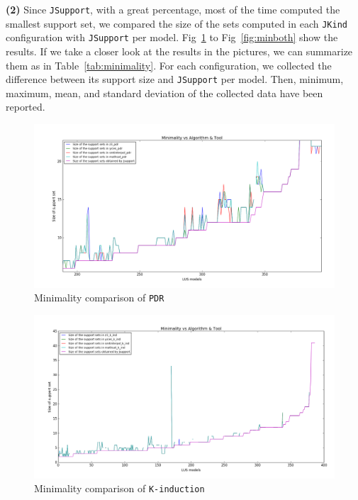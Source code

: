 \noindent{}
 \vspace{9pt}

\textbf{(2)} Since \texttt{JSupport}, with a great percentage, most of the time computed the smallest support set, we compared the size of the sets computed in each \texttt{JKind} configuration with \texttt{JSupport} per model. Fig~\ref{fig:minpdr} to Fig~\ref{fig:minboth} show the results. If we take a closer look at the results in the pictures, we can summarize them as in Table~\ref{tab:minimality}. For each configuration, we collected the difference between its support size and \texttt{JSupport} per model. Then, minimum, maximum, mean, and standard deviation of the collected data have been reported.

\begin{figure}
  \centering
  \includegraphics[width=\textwidth]{figs/minimality_pdr.png}
  \caption{Minimality comparison of \texttt{PDR}}\label{fig:minpdr}
\end{figure}

\begin{figure}
  \centering
  \includegraphics[width=\textwidth]{figs/minimality_kind.png}
  \caption{Minimality comparison of \texttt{K-induction}}\label{fig:minkind}
\end{figure}

